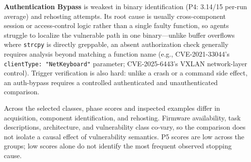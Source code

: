 \noindent\textbf{Authentication Bypass} is weakest in binary identification (P4: 3.14/15 per-run average) and rehosting attempts. Its root cause is usually cross-component session or access-control logic rather than a single faulty function, so agents struggle to localize the vulnerable path in one binary---unlike buffer overflows where \texttt{strcpy} is directly greppable, an absent authorization check generally requires analysis beyond matching a function name (e.g., CVE-2021-33044's \texttt{clientType: "NetKeyboard"} parameter; CVE-2025-6443's VXLAN network-layer control). Trigger verification is also hard: unlike a crash or a command side effect, an auth-bypass requires a controlled authenticated and unauthenticated comparison.

Across the selected classes, phase scores and inspected examples differ in acquisition, component identification, and rehosting. Firmware availability, task descriptions, architecture, and vulnerability class co-vary, so the comparison does not isolate a causal effect of vulnerability semantics. P5 scores are low across the groups; low scores alone do not identify the most frequent observed stopping cause.


